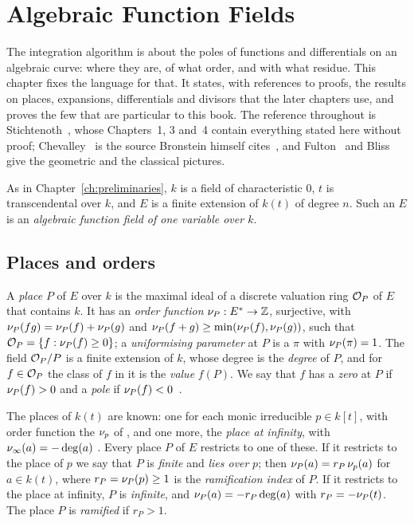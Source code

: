 \chapter{Algebraic Function Fields}\label{ch:function-fields}

The integration algorithm is about the poles of functions and differentials
on an algebraic curve: where they are, of what order, and with what residue.
This chapter fixes the language for that. It states, with references to
proofs, the results on places, expansions, differentials and divisors that
the later chapters use, and proves the few that are particular to this book.
The reference throughout is Stichtenoth~\cite{stichtenoth2009}, whose
Chapters~1, 3 and~4 contain everything stated here without proof;
Chevalley~\cite{chevalley1951} is the source Bronstein himself
cites~\cite{bronstein1990}, and Fulton~\cite{fulton2008} and
Bliss~\cite{bliss1933} give the geometric and the classical pictures.

As in Chapter~\ref{ch:preliminaries}, $k$ is a field of characteristic $0$,
$t$ is transcendental over $k$, and $E$ is a finite extension of $k(t)$ of
degree $n$. Such an $E$ is an \emph{algebraic function field of one variable
over $k$}.

\section{Places and orders}\label{sec:ff-places}

A \emph{place} $P$ of $E$ over $k$ is the maximal ideal of a discrete
valuation ring $\mathcal{O}_P$ of $E$ that contains $k$. It has an \emph{order
function} $\nu_{P} : E^* \to \mathbb{Z}$, surjective, with $\nu_{P}(fg) = \nu_{P}(f) +
\nu_{P}(g)$ and $\nu_{P}(f + g) \ge \min(\nu_{P}(f), \nu_{P}(g))$, such that
$\mathcal{O}_P = \{ f : \nu_{P}(f) \ge 0 \}$; a \emph{uniformising parameter} at $P$
is a $\pi$ with $\nu_{P}(\pi) = 1$. The field $\mathcal{O}_P / P$ is a finite
extension of $k$, whose degree is the \emph{degree} of $P$, and for $f \in
\mathcal{O}_P$ the class of $f$ in it is the \emph{value} $f(P)$. We say that $f$ has
a \emph{zero} at $P$ if $\nu_{P}(f) > 0$ and a \emph{pole} if $\nu_{P}(f) <
0$~\cite[\S1.1]{stichtenoth2009}.

The places of $k(t)$ are known: one for each monic irreducible $p \in k[t]$,
with order function the $\nu_{p}$ of , and one more, the
\emph{place at infinity}, with $\nu_{\infty}(a) = -\deg(a)$
\cite[Theorem~1.2.2]{stichtenoth2009}. Every place $P$ of $E$ restricts to
one of these. If it restricts to the place of $p$ we say that $P$ is
\emph{finite} and \emph{lies over} $p$; then $\nu_{P}(a) = r_P\, \nu_{p}(a)$
for $a \in k(t)$, where $r_P = \nu_{P}(p) \ge 1$ is the \emph{ramification
index} of $P$. If it restricts to the place at infinity, $P$ is
\emph{infinite}, and $\nu_{P}(a) = -r_P \deg(a)$ with $r_P = -\nu_{P}(t)$.
The place $P$ is \emph{ramified} if $r_P > 1$.

